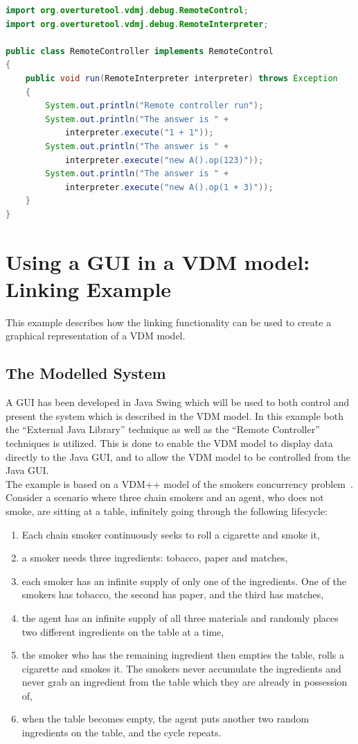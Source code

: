 \documentclass{overturerepchap}
\begin{document}
\begin{lstlisting}[language=JAVA,label=remoteControllerJava,caption=Remote Controller Java class,captionpos=b]
import org.overturetool.vdmj.debug.RemoteControl;
import org.overturetool.vdmj.debug.RemoteInterpreter;

public class RemoteController implements RemoteControl
{
	public void run(RemoteInterpreter interpreter) throws Exception
	{
		System.out.println("Remote controller run");
		System.out.println("The answer is " + 
			interpreter.execute("1 + 1")); 
		System.out.println("The answer is " + 
			interpreter.execute("new A().op(123)")); 
		System.out.println("The answer is " + 
			interpreter.execute("new A().op(1 + 3)")); 
	}
}
\end{lstlisting}

\section{Using a GUI in a VDM model: Linking Example}\label{sec:gui}

This example describes how the linking functionality can be used to create a graphical representation of a VDM model. 

\subsection{The Modelled System}
A GUI has been developed in Java Swing which will be used to both control and present the system which is described in the VDM model. In this example both the ``External Java Library'' technique as well as the ``Remote Controller'' techniques is utilized. This is done to enable the VDM model to display data directly to the Java GUI, and to allow the VDM model to be controlled from the Java GUI. \\

The example is based on a VDM++ model of the smokers concurrency problem~\cite{Patil71}. Consider a scenario where three chain smokers and an agent, who does not smoke, are sitting at a table, infinitely going through the following lifecycle:
\begin{enumerate}
\item Each chain smoker continuously seeks to roll a cigarette and  smoke it,
\item a smoker needs three ingredients: tobacco, paper and matches,
\item each smoker has an infinite supply of only one of the ingredients. 
One of the smokers has tobacco, the second has paper, and the third has
matches,
\item the agent has an infinite supply of all three materials and randomly places two different ingredients on the table at a time,
\item the smoker who has the remaining ingredient then empties the table, rolls a cigarette and smokes it. The smokers never accumulate the ingredients and never grab an ingredient from the table which they are already in possession of, 
\item when the table becomes empty, the agent puts another two random ingredients on the table, and the
cycle repeats.
\end{enumerate}
\end{document}
